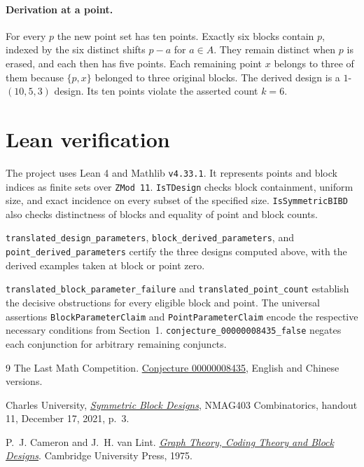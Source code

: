 \documentclass[11pt]{article}
\begin{document}
\paragraph{Derivation at a point.}
For every $p$ the new point set has ten points. Exactly six blocks
contain $p$, indexed by the six distinct shifts $p-a$ for $a\in A$.
They remain distinct when $p$ is erased, and each then has five points.
Each remaining point $x$ belongs to three of them because
$\{p,x\}$ belonged to three original blocks. The derived design is a
$1$-$(10,5,3)$ design. Its ten points violate the asserted count
$k=6$.

\section{Lean verification}

The project uses Lean 4 and Mathlib \texttt{v4.33.1}. It represents
points and block indices as finite sets over \texttt{ZMod 11}.
\texttt{IsTDesign} checks block containment, uniform size, and exact
incidence on every subset of the specified size.
\texttt{IsSymmetricBIBD} also checks distinctness of blocks and equality
of point and block counts.

{\raggedright
\texttt{translated\_design\_parameters},
\texttt{block\_derived\_parameters}, and
\texttt{point\_derived\_parameters} certify the three designs computed
above, with the derived examples taken at block or point zero.

\texttt{translated\_block\_parameter\_failure} and
\texttt{translated\_point\_count} establish the decisive obstructions
for every eligible block and point. The universal assertions
\texttt{BlockParameterClaim} and \texttt{PointParameterClaim} encode
the respective necessary conditions from Section~1.
\texttt{conjecture\_00000008435\_false} negates each conjunction for
arbitrary remaining conjuncts.
\par}

\begin{thebibliography}{9}
The Last Math Competition.
\href{https://github.com/The-Last-Math-Competition/The-Last-Math-Competition/blob/8c9cc2fb29ed8a59d7daa18ed6ba387a77cf897f/conjectures/00000008435.md}{Conjecture 00000008435},
English and Chinese versions.

Charles University, \href{https://kam.mff.cuni.cz/~honza/NDMI036/Handout-11.pdf}{\emph{Symmetric Block Designs}}, NMAG403 Combinatorics,
handout 11, December 17, 2021, p.~3.

P.~J. Cameron and J.~H. van Lint.
\href{https://assets.cambridge.org/97805212/07423/excerpt/9780521207423_excerpt.pdf}{\emph{Graph Theory, Coding Theory and Block Designs}}.
Cambridge University Press, 1975.
\end{thebibliography}
\end{document}
